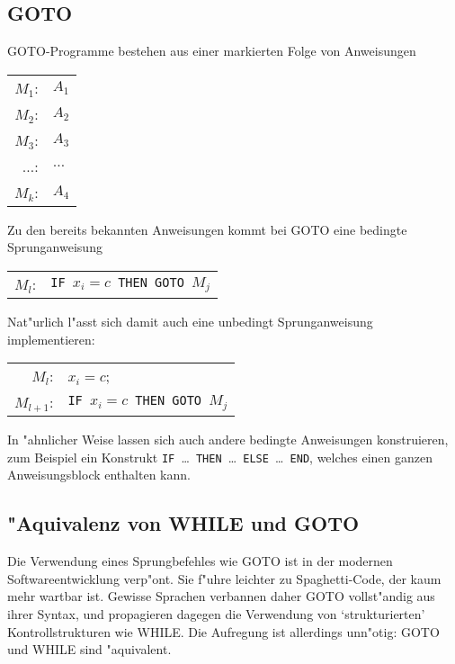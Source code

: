 \subsection{GOTO}
GOTO-Programme bestehen aus einer markierten Folge von Anweisungen
\begin{center}
\begin{tabular}{rl}
$M_1$:&$A_1$\\
$M_2$:&$A_2$\\
$M_3$:&$A_3$\\
$\dots$:&$\dots$\\
$M_k$:&$A_4$
\end{tabular}
\end{center}
Zu den bereits bekannten Anweisungen kommt bei GOTO eine bedingte
Sprunganweisung
\begin{center}
\begin{tabular}{rl}
$M_l$:&{\tt IF\ }$x_i=c${\tt\ THEN GOTO\ }$M_j$
\end{tabular}
\end{center}
Nat"urlich l"asst sich damit auch eine unbedingt Sprunganweisung
implementieren:
\begin{center}
\begin{tabular}{rl}
$M_l$:&$x_i=c$;\\
$M_{l+1}$:&{\tt IF\ }$x_i=c${\tt\ THEN GOTO\ }$M_j$
\end{tabular}
\end{center}
In "ahnlicher Weise lassen sich auch andere bedingte Anweisungen
konstruieren, zum Beispiel ein
Konstrukt {\tt IF }\dots{\tt\ THEN }\dots{\tt\ ELSE }\dots{\tt\ END}, welches
einen ganzen Anweisungsblock enthalten kann.

\subsection{"Aquivalenz von WHILE und GOTO}
Die Verwendung eines Sprungbefehles wie GOTO ist in der modernen
Softwareentwicklung verp"ont. Sie f"uhre leichter zu Spaghetti-Code,
der kaum mehr wartbar ist. Gewisse Sprachen verbannen daher
GOTO vollst"andig aus ihrer Syntax, und propagieren dagegen
die Verwendung von `strukturierten' Kontrollstrukturen wie
WHILE. Die Aufregung ist allerdings unn"otig: GOTO und WHILE sind "aquivalent.


